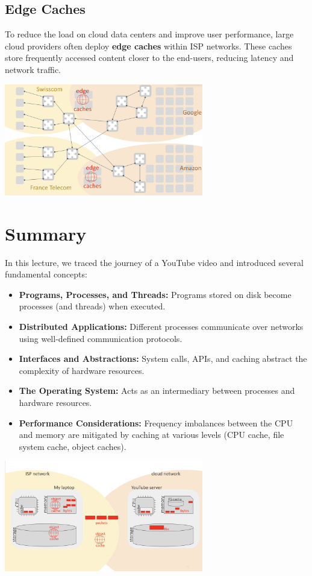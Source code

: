 \subsection{Edge Caches}
To reduce the load on cloud data centers and improve user performance, large cloud providers often deploy \textbf{edge caches} within ISP networks. These caches store frequently accessed content closer to the end-users, reducing latency and network traffic.
\begin{center}
  \includegraphics[width=0.65\textwidth]{chapters/L1/images/edge_caches.png}
\end{center}
\section{Summary}
In this lecture, we traced the journey of a YouTube video and introduced several fundamental concepts:
\begin{itemize}
  \item \textbf{Programs, Processes, and Threads:} Programs stored on disk become processes (and threads) when executed.
  \item \textbf{Distributed Applications:} Different processes communicate over networks using well-defined communication protocols.
  \item \textbf{Interfaces and Abstractions:} System calls, APIs, and caching abstract the complexity of hardware resources.
  \item \textbf{The Operating System:} Acts as an intermediary between processes and hardware resources.
  \item \textbf{Performance Considerations:} Frequency imbalances between the CPU and memory are mitigated by caching at various levels (CPU cache, file system cache, object caches).
\end{itemize}

\begin{center}
  \includegraphics[width=0.65\textwidth]{chapters/L1/images/conclusion_youtube.png}
\end{center}

